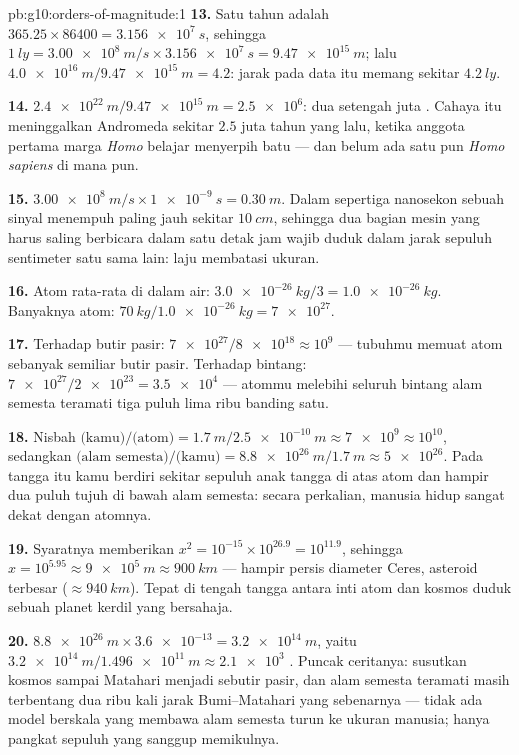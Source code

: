\begin{solution}{pb:g10:orders-of-magnitude:1}
\textbf{13.} Satu tahun adalah
$365.25 \times 86400 = \qty{3.156e7}{s}$, sehingga
$\qty{1}{ly} = \qty{3.00e8}{m/s} \times \qty{3.156e7}{s}
= \qty{9.47e15}{m}$; lalu
$\qty{4.0e16}{m}/\qty{9.47e15}{m} = 4.2$: jarak pada data itu memang
sekitar $\qty{4.2}{ly}$.

\textbf{14.} $\qty{2.4e22}{m}/\qty{9.47e15}{m} = \num{2.5e6}$: dua
setengah juta . Cahaya itu meninggalkan Andromeda sekitar
$2.5$ juta tahun yang lalu, ketika anggota pertama marga \emph{Homo}
belajar menyerpih batu --- dan belum ada satu pun \emph{Homo sapiens}
di mana pun.

\textbf{15.} $\qty{3.00e8}{m/s} \times \qty{1e-9}{s} = \qty{0.30}{m}$.
Dalam sepertiga nanosekon sebuah sinyal menempuh paling jauh sekitar
$\qty{10}{cm}$, sehingga dua bagian mesin yang harus saling berbicara
dalam satu detak jam wajib duduk dalam jarak sepuluh sentimeter satu
sama lain: laju membatasi ukuran.

\textbf{16.} Atom rata-rata di dalam air:
$\qty{3.0e-26}{kg}/3 = \qty{1.0e-26}{kg}$. Banyaknya atom:
$\qty{70}{kg}/\qty{1.0e-26}{kg} = \num{7e27}$.

\textbf{17.} Terhadap butir pasir:
$\num{7e27}/\num{8e18} \approx 10^{9}$ --- tubuhmu memuat atom
sebanyak semiliar butir pasir. Terhadap bintang:
$\num{7e27}/\num{2e23} = \num{3.5e4}$ --- atommu melebihi seluruh
bintang alam semesta teramati tiga puluh lima ribu banding satu.

\textbf{18.} Nisbah $\text{(kamu)}/\text{(atom)} =
\qty{1.7}{m}/\qty{2.5e-10}{m} \approx \num{7e9} \approx 10^{10}$,
sedangkan $\text{(alam semesta)}/\text{(kamu)} =
\qty{8.8e26}{m}/\qty{1.7}{m} \approx \num{5e26}$. Pada tangga itu kamu
berdiri sekitar sepuluh anak tangga di atas atom dan hampir dua puluh
tujuh di bawah alam semesta: secara perkalian, manusia hidup sangat
dekat dengan atomnya.

\textbf{19.} Syaratnya memberikan
$x^{2} = 10^{-15} \times 10^{26.9} = 10^{11.9}$, sehingga
$x = 10^{5.95} \approx \qty{9e5}{m} \approx \qty{900}{km}$ --- hampir
persis diameter Ceres, asteroid terbesar
($\approx \qty{940}{km}$). Tepat di tengah tangga antara inti atom dan
kosmos duduk sebuah planet kerdil yang bersahaja.

\textbf{20.} $\qty{8.8e26}{m} \times \num{3.6e-13} = \qty{3.2e14}{m}$,
yaitu $\qty{3.2e14}{m}/\qty{1.496e11}{m} \approx \num{2.1e3}$
. Puncak ceritanya: susutkan kosmos sampai Matahari
menjadi sebutir pasir, dan alam semesta teramati masih terbentang dua
ribu kali jarak Bumi--Matahari yang sebenarnya --- tidak ada model
berskala yang membawa alam semesta turun ke ukuran manusia; hanya
pangkat sepuluh yang sanggup memikulnya.
\end{solution}
